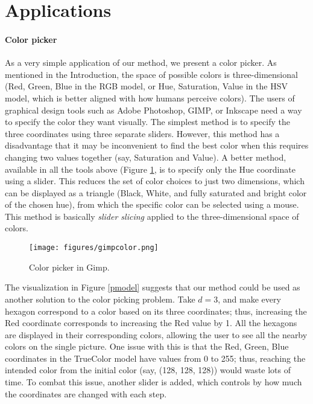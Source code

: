 \documentclass{article}
\begin{document}
\section{Applications}

\paragraph{Color picker}
As a very simple application of our method, we present a color picker. As mentioned in the Introduction, the space of possible colors is three-dimensional
(Red, Green, Blue in the RGB model, or Hue, Saturation, Value in the HSV model, which is better aligned with how humans perceive colors). The users of graphical design tools
such as Adobe Photoshop, GIMP, or Inkscape need a way to specify the color they want visually. The simplest method is to specify the three coordinates using three separate sliders.
However, this method has a disadvantage that it may be inconvenient to find the best color when this requires changing two values together (say, Saturation and Value). A better method,
available in all the tools above (Figure \ref{gimp}, is to specify only the Hue coordinate using a slider. This reduces the set of color choices to just two dimensions, which can be displayed as 
a triangle (Black, White, and fully saturated and bright color of the chosen hue), from which the specific color can be selected using a mouse. This method is basically {\it slider slicing}
applied to the three-dimensional space of colors.

\begin{figure}
\texttt{[image: figures/gimpcolor.png]}
\caption{Color picker in Gimp.\label{gimp}}
\end{figure}

The visualization in Figure \ref{pmodel} suggests that our method could be used as another solution to the color picking problem. Take $d=3$, and make every hexagon correspond to a color
based on its three coordinates; thus, increasing the Red coordinate corresponds to increasing the Red value by 1. All the hexagons are displayed in their corresponding colors, allowing
the user to see all the nearby colors on the single picture. One issue with this is that the Red, Green, Blue coordinates in the TrueColor model have values from 0 to 255; thus,
reaching the intended color from the initial color (say, (128, 128, 128)) would waste lots of time. To combat this issue, another slider is added, which controls by how much the coordinates
are changed with each step.
\end{document}
